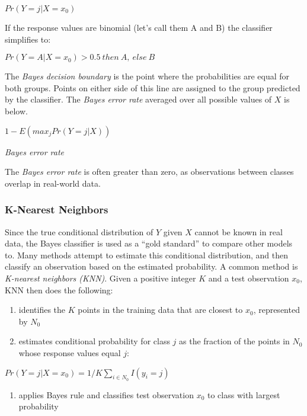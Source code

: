 \documentclass[]{book}
\providecommand{\tightlist}{%
  \setlength{\itemsep}{0pt}\setlength{\parskip}{0pt}}
\theoremstyle{definition}
\theoremstyle{definition}
\theoremstyle{definition}
\theoremstyle{remark}
\begin{document}
\(Pr(Y = j|X = x_0)\)

If the response values are binomial (let's call them A and B) the
classifier simplifies to:

\(Pr(Y = A|X = x_0) > 0.5\:then\:A,\:else\:B\)

The \emph{Bayes decision boundary} is the point where the probabilities
are equal for both groups. Points on either side of this line are
assigned to the group predicted by the classifier. The \emph{Bayes error
rate} averaged over all possible values of \(X\) is below.

\(1-E(max_jPr(Y = j|X))\)

\emph{Bayes error rate}

The \emph{Bayes error rate} is often greater than zero, as observations
between classes overlap in real-world data.

\subsubsection{K-Nearest Neighbors}\label{k-nearest-neighbors}

Since the true conditional distribution of \(Y\) given \(X\) cannot be
known in real data, the Bayes classifier is used as a ``gold standard''
to compare other models to. Many methods attempt to estimate this
conditional distribution, and then classify an observation based on the
estimated probability. A common method is \emph{K-nearest neighbors
(KNN)}. Given a positive integer \(K\) and a test observation \(x_0\),
KNN then does the following:

\begin{enumerate}
\def\labelenumi{\arabic{enumi}.}
\tightlist
\item
  identifies the \(K\) points in the training data that are closest to
  \(x_0\), represented by \(N_0\)
\item
  estimates conditional probability for class \(j\) as the fraction of
  the points in \(N_0\) whose response values equal \(j\):
\end{enumerate}

\(Pr(Y = j| X = x_0) = 1/K\sum_{i\in N_0}I(y_i = j)\)

\begin{enumerate}
\def\labelenumi{\arabic{enumi}.}
\setcounter{enumi}{2}
\tightlist
\item
  applies Bayes rule and classifies test observation \(x_0\) to class
  with largest probability
\end{enumerate}
\end{document}
